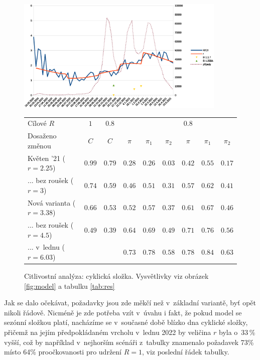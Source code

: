 \begin{figure}

\begin{center}

\includegraphics[width=10cm]{pic/wholec} 

\begin{tabular}{l|c|c|ccc|ccc}									
Cílové $R$	& $1$	& $0.8$	&	&	&	& $0.8$	&	&	\\ 
Dosaženo změnou	& $C$	& $C$	& $\pi$	& $\pi_1$	& $\pi_2$	& $\pi$	& $\pi_1$	& $\pi_2$	\\ \hline
Květen '21 ($r=2.25$)	& $0.99$	& $0.79$	& $0.28$	& $0.26$	& $0.03$	& $0.42$	& $0.55$	& $0.17$	\\
... bez roušek ($r=3$)	& $0.74$	& $0.59$	& $0.46$	& $0.51$	& $0.31$	& $0.57$	& $0.62$	& $0.41$	\\
Nová varianta ($r=3.38$)	& $0.66$	& $0.53$	& $0.52$	& $0.57$	& $0.37$	& $0.61$	& $0.67$	& $0.46$	\\
... bez roušek ($r=4.5$)	& $0.49$	& $0.39$	& $0.64$	& $0.69$	& $0.49$	& $0.71$	& $0.76$	& $0.56$	\\
... v~lednu ($r=6.03$)	&	&	& $0.73$	& $0.78$	& $0.58$	& $0.78$	& $0.84$	& $0.63$	\\
\end{tabular}									


\caption{Citlivostní analýza: cyklická složka. Vysvětlivky viz obrázek \ref{fig:model} a tabulku \ref{tab:res}}
\label{fig:cc}
\end{center}

\end{figure}
Jak se dalo očekávat, požadavky jsou zde měkčí než v~základní variantě,
byť opět nikoli řádově. Nicméně je zde potřeba vzít v~úvahu i fakt, že  pokud model se sezónní složkou platí, nacházíme se v~současné době blízko dna cyklické složky, přičemž na jejím předpokládaném
vrcholu v~lednu 2022 by veličina $r$ byla o~33\,\% vyšší, což by například
v~nejhorším scénáři z~tabulky znamenalo požadavek 73\% místo 64\% proočkovanosti
pro udržení $R=1$, viz poslední řádek tabulky.

